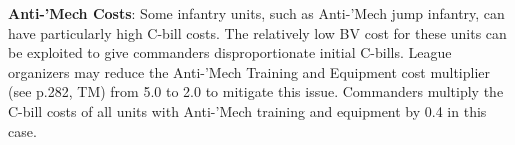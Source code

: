 \item {\bfseries Anti-'Mech Costs}: Some infantry units, such as Anti-'Mech jump infantry, can have particularly high C-bill costs.
The relatively low BV cost for these units can be exploited to give commanders disproportionate initial C-bills.
League organizers may reduce the Anti-'Mech Training and Equipment cost multiplier (see p.282, TM) from 5.0 to 2.0 to mitigate this issue.
Commanders multiply the C-bill costs of all units with Anti-'Mech training and equipment by 0.4 in this case.
